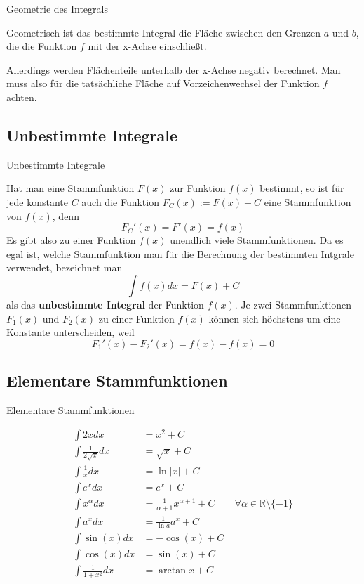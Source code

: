 \begin{frame}{Geometrie des Integrals}
	\begin{bemerkung}
		Geometrisch ist das bestimmte Integral die Fläche zwischen den Grenzen $a$ und $b$, die die Funktion $f$ mit der x-Achse einschließt.
		
		Allerdings werden Flächenteile unterhalb der x-Achse negativ berechnet. Man muss also für die tatsächliche Fläche auf Vorzeichenwechsel der Funktion $f$ achten.
	\end{bemerkung}
\end{frame}

\subsection{Unbestimmte Integrale}

\begin{frame}{Unbestimmte Integrale}
	\begin{bemerkung}
		Hat man eine Stammfunktion $F(x)$ zur Funktion $f(x)$ bestimmt, so ist für jede konstante $C$ auch die Funktion $F_{C}(x) := F(x) + C$ eine Stammfunktion von $f(x)$, denn
		\[
			F_{C}'(x) = F'(x) = f(x)
		\]
		Es gibt also zu einer Funktion $f(x)$ unendlich viele Stammfunktionen.
		Da es egal ist, welche Stammfunktion man für die Berechnung der bestimmten Intgrale verwendet, bezeichnet man 
		\[
			\int f(x) dx = F(x) + C
		\]
		als das \textbf{unbestimmte Integral} der Funktion $f(x)$.
		Je zwei Stammfunktionen $F_{1}(x)$ und $F_{2}(x)$ zu einer Funktion $f(x)$ können sich höchstens um eine Konstante unterscheiden, weil
		\[
			F_{1}'(x) - F_{2}'(x) = f(x) - f(x) = 0
		\]
	\end{bemerkung}
\end{frame}

\subsection{Elementare Stammfunktionen}

\begin{frame}{Elementare Stammfunktionen}
\footnotesize{
	\begin{example}
		\begin{align*}
			\int 2x dx & = x^2 +C \\
			\int \frac{1}{2\sqrt{x}} dx & = \sqrt{x} + C \\
			\int \frac{1}{x} dx & = \ln |x| + C \\
			\int e^{x} dx & = e^{x} + C \\
			\int x^{\alpha} dx & = \frac{1}{\alpha + 1} x^{\alpha + 1} + C \qquad \forall \alpha \in \mathbb{R} \setminus \{ -1 \} \\
			\int a^{x} dx & = \frac{1}{\ln a} a^{x} + C \\
			\int \sin (x) dx & = - \cos (x) + C \\
			\int \cos (x) dx & = \sin (x) +C \\
			\int \frac{1}{1+x^{2}} dx & = \arctan x + C
		\end{align*}	
	\end{example}}
\end{frame}

